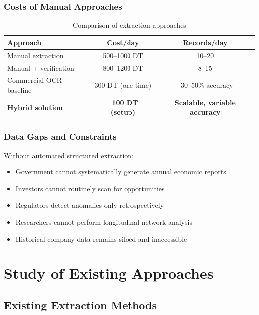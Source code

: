 \documentclass[12pt,a4paper]{report}
\begin{document}
\subsection{Costs of Manual Approaches}

\begin{table}[H]
\centering
\begin{tabular}{|l|c|c|}
\hline
\textbf{Approach} & \textbf{Cost/day} & \textbf{Records/day} \\
\hline
Manual extraction & 500--1000 DT & 10--20 \\
Manual + verification & 800--1200 DT & 8--15 \\
Commercial OCR baseline & 300 DT (one-time) & ~30--50\% accuracy \\
\textbf{Hybrid solution} & \textbf{~100 DT (setup)} & \textbf{Scalable, variable accuracy} \\
\hline
\end{tabular}
\caption{Comparison of extraction approaches}
\end{table}

\subsection{Data Gaps and Constraints}

Without automated structured extraction:
\begin{itemize}
    \item Government cannot systematically generate annual economic reports
    \item Investors cannot routinely scan for opportunities
    \item Regulators detect anomalies only retrospectively
    \item Researchers cannot perform longitudinal network analysis
    \item Historical company data remains siloed and inaccessible
\end{itemize}

\chapter{Study of Existing Approaches}

\section{Existing Extraction Methods}
\end{document}
